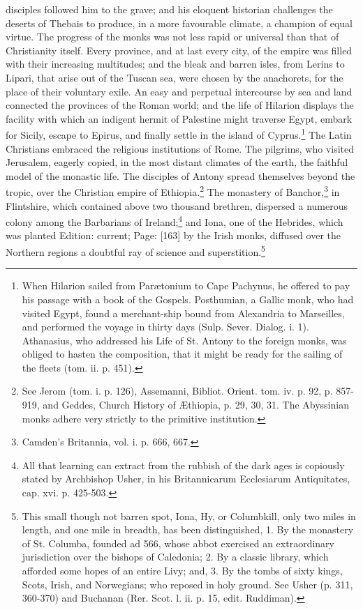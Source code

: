 disciples followed him to the grave; and his eloquent historian challenges the deserts of Thebais to produce, in a more favourable climate, a champion of equal virtue. The progress of the monks was not less rapid or universal than that of Christianity itself. Every province, and at last every city, of the empire was filled with their increasing multitudes; and the bleak and barren isles, from Lerins to Lipari, that arise out of the Tuscan sea, were chosen by the anachorets, for the place of their voluntary exile. An easy and perpetual intercourse by sea and land connected the provinces of the Roman world; and the life of Hilarion displays the facility with which an indigent hermit of Palestine might traverse Egypt, embark for Sicily, escape to Epirus, and finally settle in the island of Cyprus.\footnote{When Hilarion sailed from Parætonium to Cape Pachynus, he offered to pay his passage with a book of the Gospels. Posthumian, a Gallic monk, who had visited Egypt, found a merchant-ship bound from Alexandria to Marseilles, and performed the voyage in thirty days (Sulp. Sever. Dialog. i. 1). Athanasius, who addressed his Life of St. Antony to the foreign monks, was obliged to hasten the composition, that it might be ready for the sailing of the fleets (tom. ii. p. 451).} The Latin Christians embraced the religious institutions of Rome. The pilgrims, who visited Jerusalem, eagerly copied, in the most distant climates of the earth, the faithful model of the monastic life. The disciples of Antony spread themselves beyond the tropic, over the Christian empire of Ethiopia.\footnote{See Jerom (tom. i. p. 126), Assemanni, Bibliot. Orient. tom. iv. p. 92, p. 857-919, and Geddes, Church History of Æthiopia, p. 29, 30, 31. The Abyssinian monks adhere very strictly to the primitive institution.} The monastery of Banchor,\footnote{Camden\texthebrew{}’s Britannia, vol. i. p. 666, 667.} in Flintshire, which contained above two thousand brethren, dispersed a numerous colony among the Barbarians of Ireland;\footnote{All that learning can extract from the rubbish of the dark ages is copiously stated by Archbishop Usher, in his Britannicarum Ecclesiarum Antiquitates, cap. xvi. p. 425-503.} and Iona, one of the Hebrides, which was planted Edition: current; Page: [163] by the Irish monks, diffused over the Northern regions a doubtful ray of science and superstition.\footnote{This small though not barren spot, Iona, Hy, or Columbkill, only two miles in length, and one mile in breadth, has been distinguished, 1. By the monastery of St. Columba, founded ad 566, whose abbot exercised an extraordinary jurisdiction over the bishops of Caledonia; 2. By a classic library, which afforded some hopes of an entire Livy; and, 3. By the tombs of sixty kings, Scots, Irish, and Norwegians; who reposed in holy ground. See Usher (p. 311, 360-370) and Buchanan (Rer. Scot. l. ii. p. 15, edit. Ruddiman).}

